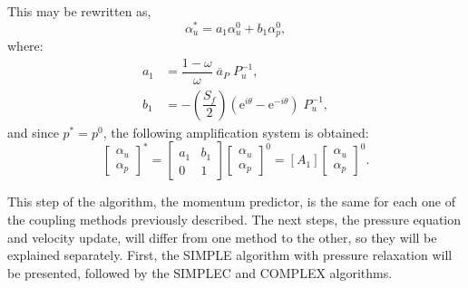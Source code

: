 \documentclass[final,3p,times,11pt,onecolumn]{myElsarticle}
\numberwithin{equation}{section}
\begin{document}
This may be rewritten as,
\begin{equation}
     \alpha_u^* = a_1 \alpha_u^0 + b_1 \alpha_p^0,
    \label{eq:MPfou2}
\end{equation}
where:
\begin{equation}
\begin{split}
     a_1 &= \dfrac{1-\omega}{\omega} \; \overline{a}_P \; P_u^{-1},
\\
b_1 &= - \left( \dfrac{S_f}{2} \right) \left( \text{e}^{i \theta} -  \text{e}^{-i \theta} \right) \; P_u^{-1},
\end{split}
\end{equation}
and since $p^* = p^0$, the following amplification system is obtained:
\begin{equation}
\begin{bmatrix}
\alpha_u \\
\alpha_p 
\end{bmatrix}^{*} =
\begin{bmatrix}
a_1 & b_1 \\
0 & 1
\end{bmatrix}
\begin{bmatrix}
\alpha_u \\
\alpha_p 
\end{bmatrix}^{0} =
[A_1]
\begin{bmatrix}
\alpha_u \\
\alpha_p 
\end{bmatrix}^{0}.
\end{equation}

This step of the algorithm, the momentum predictor, is the same for each one of the coupling methods previously described. The next steps, the pressure equation and velocity update, will differ from one method to the other, so they will be explained separately. First, the SIMPLE algorithm with pressure relaxation will be presented, followed by the SIMPLEC and COMPLEX algorithms.
\end{document}
